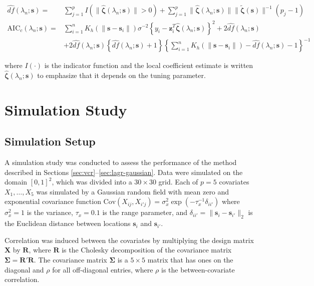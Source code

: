 \documentclass[authoryear,review, 12pt]{elsarticle}
\begin{document}
\begin{align*}
\hat{df}(\lambda_{n};\bm{s})= & \sum_{j=1}^{p}I\left(\|\hat{\bm{\zeta}}(\lambda_{n};\bm{s})\|>0\right)+\sum_{j=1}^{p}\|\hat{\bm{\zeta}}(\lambda_{n};\bm{s})\|\|\tilde{\bm{\zeta}}(\bm{s})\|^{-1}(p_{j}-1)\\
\text{AIC}_{c}(\lambda_{n};\bm{s})= & \sum_{i=1}^{n}K_{h}(\|\bm{s}-\bm{s}_{i}\|)\sigma^{-2}\left\{ y_{i}-\bm{z}_{i}^{T}\hat{\bm{\zeta}}(\lambda_{n};\bm{s})\right\} ^{2}+2\hat{df}(\lambda_{n};\bm{s})\\
 & +2\hat{df}(\lambda_{n};\bm{s})\left\{ \hat{df}(\lambda_{n};\bm{s})+1\right\} \left\{ \sum_{i=1}^{n}K_{h}(\|\bm{s}-\bm{s}_{i}\|)-\hat{df}(\lambda_{n};\bm{s})-1\right\} ^{-1}
\end{align*}


where $I\left(\cdot\right)$ is the indicator function and the local
coefficient estimate is written $\hat{\bm{\zeta}}(\lambda_{n};\bm{s})$
to emphasize that it depends on the tuning parameter.


\section{Simulation Study\label{sec:simulations}}




\subsection{Simulation Setup}

A simulation study was conducted to assess the performance of the
method described in Sections \ref{sec:vcr}--\ref{sec:lagr-gaussian}.
Data were simulated on the domain $[0,1]^{2}$, which was divided
into a $30\times30$ grid. Each of $p=5$ covariates $X_{1},\dots,X_{5}$
was simulated by a Gaussian random field with mean zero and exponential
covariance function $\text{Cov}\left(X_{ij},X_{i'j}\right)=\sigma_{x}^{2}\exp\left(-\tau_{x}^{-1}\delta_{ii'}\right)$
where $\sigma_{x}^{2}=1$ is the variance, $\tau_{x}=0.1$ is the
range parameter, and $\delta_{ii'}=\|\bm{s}_{i}-\bm{s}_{i'}\|_{2}$
is the Euclidean distance between locations $\bm{s}_{i}$ and $\bm{s}_{i'}$. 

Correlation was induced between the covariates by multiplying the
design matrix $\bm{X}$ by $\bm{R}$, where $\bm{R}$ is the Cholesky
decomposition of the covariance matrix $\bm{\Sigma}=\bm{R}'\bm{R}$.
The covariance matrix $\bm{\Sigma}$ is a $5\times5$ matrix that
has ones on the diagonal and $\rho$ for all off-diagonal entries,
where $\rho$ is the between-covariate correlation. 
\end{document}
